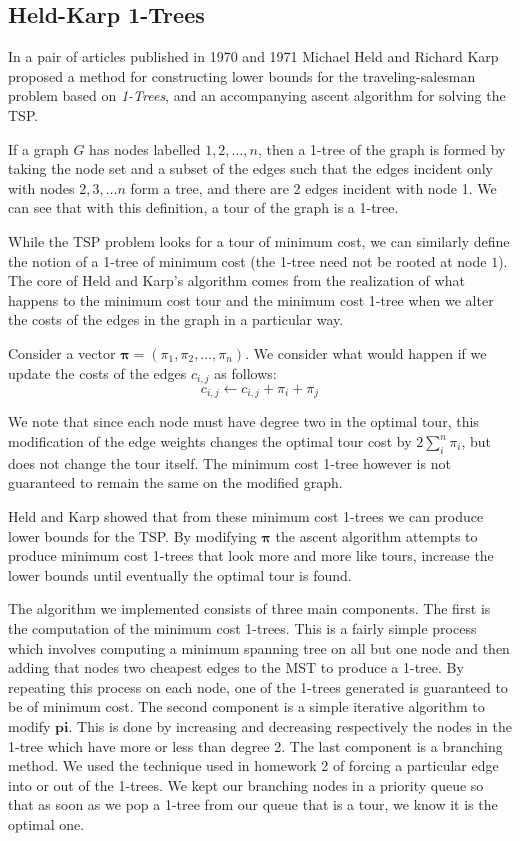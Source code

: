 \documentclass[11pt]{article}
\newcommand{\ve}[1]{\boldsymbol{#1}}
\begin{document}
\subsection{Held-Karp 1-Trees}

In a pair of articles published in 1970 and 1971 \cite{OneTree70,OneTree71} Michael Held and Richard Karp proposed a method for constructing lower bounds for the traveling-salesman problem based on \emph{1-Trees}, and an accompanying ascent algorithm for solving the TSP.

If a graph $G$ has nodes labelled $1, 2, \dots, n$, then a 1-tree of the graph is formed by taking the node set and a subset of the edges such that the edges incident only with nodes $2, 3, \dots n$ form a tree, and there are 2 edges incident with node 1. We can see that with this definition, a tour of the graph is  a 1-tree.

While the TSP problem looks for a tour of minimum cost, we can similarly define the notion of a 1-tree of minimum cost (the 1-tree need not be rooted at node $1$). The core of Held and Karp's algorithm comes from the realization of what happens to the minimum cost tour and the minimum cost 1-tree when we alter the costs of the edges in the graph in a particular way.

Consider a vector $\ve{\pi} = (\pi_1, \pi_2, \dots, \pi_n)$. We consider what would happen if we update the costs of the edges $c_{i,j}$ as follows:
$$ c_{i,j} \leftarrow c_{i,j} + \pi_i + \pi_j $$

We note that since each node must have degree two in the optimal tour, this modification of the edge weights changes the optimal tour cost by $2 \sum\limits_i^n \pi_i$, but does not change the tour itself. The minimum cost 1-tree however is not guaranteed to remain the same on the modified graph.

Held and Karp showed that from these minimum cost 1-trees we can produce lower bounds for the TSP. By modifying $\ve{\pi}$ the ascent algorithm attempts to produce minimum cost 1-trees that look more and more like tours, increase the lower bounds until eventually the optimal tour is found.

The algorithm we implemented consists of three main components. The first is the computation of the minimum cost 1-trees. This is a fairly simple process which involves computing a minimum spanning tree on all but one node and then adding that nodes two cheapest edges to the MST to produce a 1-tree. By repeating this process on each node, one of the 1-trees generated is guaranteed to be of minimum cost. The second component is a simple iterative algorithm to modify $\ve{pi}$. This is done by increasing and decreasing respectively the nodes in the 1-tree which have more or less than degree 2. The last component is a branching method. We used the technique used in homework 2 of forcing a particular edge into or out of the 1-trees. We kept our branching nodes in a priority queue so that as soon as we pop a 1-tree from our queue that is a tour, we know it is the optimal one.
\end{document}

